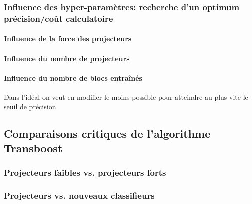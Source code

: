 \documentclass[11 pt]{article}
\begin{document}
\subsubsection{Influence des hyper-paramètres: recherche d'un optimum précision/coût calculatoire}
\paragraph{Influence de la force des projecteurs}
\paragraph{Influence du nombre de projecteurs}
\paragraph{Influence du nombre de blocs entraînés}
Dans l’idéal on veut en modifier le moins possible pour atteindre au plus vite le seuil de précision

\subsection{Comparaisons critiques de l'algorithme Transboost}
\subsubsection{Projecteurs faibles vs. projecteurs forts}
\subsubsection{Projecteurs vs. nouveaux classifieurs}

\pagebreak


%
%
%
\end{document}
